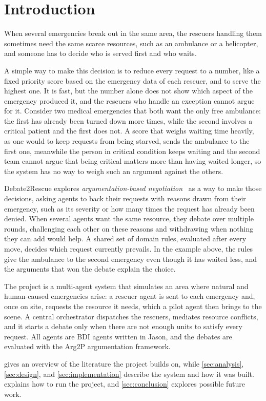 \section{Introduction}

When several emergencies break out in the same area, the rescuers handling them sometimes need the same scarce resources, such as an ambulance or a helicopter, and someone has to decide who is served first and who waits.

A simple way to make this decision is to reduce every request to a number, like a fixed priority score based on the emergency data of each rescuer, and to serve the highest one.
It is fast, but the number alone does not show which aspect of the emergency produced it, and the rescuers who handle an exception cannot argue for it.
Consider two medical emergencies that both want the only free ambulance: the first has already been turned down more times, while the second involves a critical patient and the first does not.
A score that weighs waiting time heavily, as one would to keep requests from being starved, sends the ambulance to the first one, meanwhile the person in critical condition keeps waiting and the second team cannot argue that being critical matters more than having waited longer, so the system has no way to weigh such an argument against the others.

Debate2Rescue explores \emph{argumentation-based negotiation}~\citep{rahwan2003} as a way to make those decisions, asking agents to back their requests with reasons drawn from their emergency, such as its severity or how many times the request has already been denied.
When several agents want the same resource, they debate over multiple rounds, challenging each other on these reasons and withdrawing when nothing they can add would help.
A shared set of domain rules, evaluated after every move, decides which request currently prevails.
In the example above, the rules give the ambulance to the second emergency even though it has waited less, and the arguments that won the debate explain the choice.

The project is a multi-agent system that simulates an area where natural and human-caused emergencies arise: a rescuer agent is sent to each emergency and, once on site, requests the resource it needs, which a pilot agent then brings to the scene.
A central orchestrator dispatches the rescuers, mediates resource conflicts, and it starts a debate only when there are not enough units to satisfy every request.
All agents are BDI agents written in Jason, and the debates are evaluated with the Arg2P argumentation framework.

 gives an overview of the literature the project builds on, while \cref{sec:analysis}, \cref{sec:design}, and \cref{sec:implementation} describe the system and how it was built.
 explains how to run the project, and \cref{sec:conclusion} explores possible future work.
